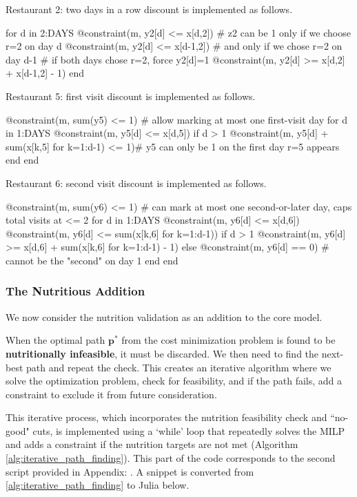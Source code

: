 \documentclass{article}
\begin{document}
Restaurant 2: two days in a row discount is implemented as follows.
\begin{shadowminted}
for d in 2:DAYS 
    @constraint(m, y2[d] <= x[d,2])  # z2 can be 1 only if we choose r=2 on day d
    @constraint(m, y2[d] <= x[d-1,2])  # and only if we chose r=2 on day d-1
    # if both days chose r=2, force y2[d]=1 
    @constraint(m, y2[d] >= x[d,2] + x[d-1,2] - 1) 
end
\end{shadowminted}

Restaurant 5: first visit discount is implemented as follows.
\begin{shadowminted}
@constraint(m, sum(y5) <= 1)  # allow marking at most one first-visit day
for d in 1:DAYS
    @constraint(m, y5[d] <= x[d,5])
    if d > 1
        @constraint(m, y5[d] + sum(x[k,5] for k=1:d-1) <= 1)# y5 can only be 1 on the first day r=5 appears
    end
end
\end{shadowminted}
Restaurant 6: second visit discount is implemented as follows.
\begin{shadowminted}
@constraint(m, sum(y6) <= 1) # can mark at most one second-or-later day, caps total visits at <= 2
for d in 1:DAYS
    @constraint(m, y6[d] <= x[d,6])
    @constraint(m, y6[d] <= sum(x[k,6] for k=1:d-1))
    if d > 1
        @constraint(m, y6[d] >= x[d,6] + sum(x[k,6] for k=1:d-1) - 1)
    else
        @constraint(m, y6[d] == 0) # cannot be the "second" on day 1
    end
end
\end{shadowminted}





\subsubsection{The Nutritious Addition}
We now consider the nutrition validation as an addition to the core model.

When the optimal path $\mathbf{p}^*$ from the cost minimization problem is found to be \textbf{nutritionally infeasible}, it must be discarded. We then need to find the next-best path and repeat the check. This creates an iterative algorithm where we solve the optimization problem, check for feasibility, and if the path fails, add a constraint to exclude it from future consideration.

This iterative process, which incorporates the nutrition feasibility check and ``no-good" cuts, is implemented using a `while' loop that repeatedly solves the MILP and adds a constraint if the nutrition targets are not met (Algorithm \ref{alg:iterative_path_finding}). This part of the code corresponds to the second script provided in Appendix: . A snippet is converted from \ref{alg:iterative_path_finding} to Julia below.
\end{document}
